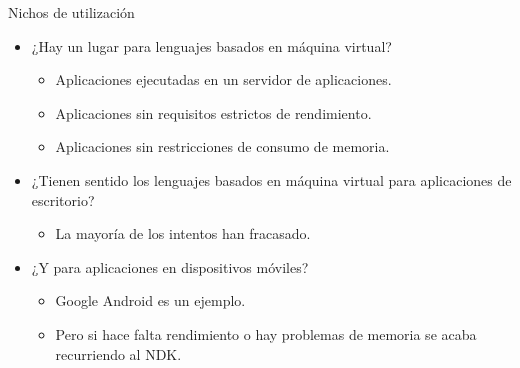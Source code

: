 \begin{frame}[t]{Nichos de utilización}
  \begin{itemize}
    \item ¿Hay un lugar para lenguajes basados en máquina virtual?
      \begin{itemize}
        \item Aplicaciones ejecutadas en un servidor de aplicaciones.
        \item Aplicaciones sin requisitos estrictos de rendimiento.
        \item Aplicaciones sin restricciones de consumo de memoria.
      \end{itemize}
    \item ¿Tienen sentido los lenguajes basados en máquina virtual para aplicaciones de escritorio?
      \begin{itemize}
        \item La mayoría de los intentos han fracasado.
      \end{itemize}
    \item ¿Y para aplicaciones en dispositivos móviles?
      \begin{itemize}
        \item Google Android es un ejemplo.
        \item Pero si hace falta rendimiento o hay problemas de memoria se acaba recurriendo al NDK.
      \end{itemize}
  \end{itemize}
\end{frame}

